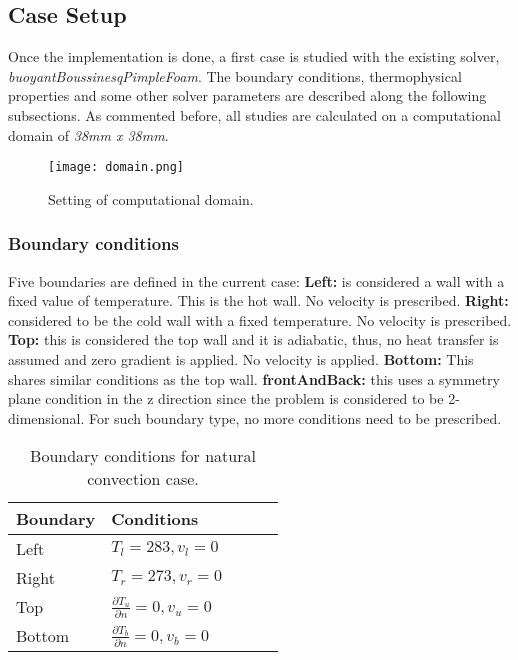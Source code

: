 \subsection{Case Setup}
Once the implementation is done, a first case is studied with the existing solver, \textit{buoyantBoussinesqPimpleFoam}. 
The boundary conditions, thermophysical properties and some other solver parameters are described along the following subsections.
\newline
As commented before, all studies are calculated on a computational domain of \textit{38mm x 38mm}. 
\begin{figure}[h]
	\label{3.43}	\centering	
	\texttt{[image: domain.png]}
	\caption{Setting of computational domain.}
\end{figure} 

\subsubsection*{Boundary conditions}
Five boundaries are defined in the current case:
\newline
\textbf{Left:} is considered a wall with a fixed value of temperature. This is the hot wall. No velocity is prescribed.
\newline
\textbf{Right:} considered to be the cold wall with a fixed temperature. No velocity is prescribed.
\newline
\textbf{Top:} this is considered the top wall and it is adiabatic, thus, no heat transfer is assumed and zero gradient is applied. No velocity is applied.
\newline 
\textbf{Bottom:} This shares similar conditions as the top wall.
\newline
\textbf{frontAndBack:} this uses a symmetry plane condition in the z direction since the problem is considered to be 2-dimensional. For such boundary type, no more conditions need to be prescribed.
\begin{table}[h!]
	\begin{tabular}{@{}lllll@{}}
		\toprule[1pt]
		\textbf{Boundary} & \textbf{Conditions}  \\ \midrule[2pt]
		Left & $T_{l}=283, v_{l} = 0   $  \\
		Right & $T_{r}=273, v_{r} = 0 $ \\
		Top & $\frac{\partial T_{u}}{\partial n} = 0, v_{u} = 0$  \\
		Bottom & $\frac{\partial T_{b}}{\partial n} = 0, v_{b} = 0$  \\ \bottomrule[1pt]		
	\end{tabular}
	\centering
	\caption{Boundary conditions for natural convection case.}	
	\label{fig:boundaryCdsNaturalConvection}
\end{table}


